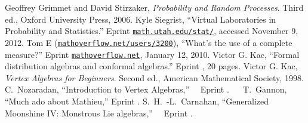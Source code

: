 \begin{thebibliography}{99}\small
{}
Geoffrey Grimmet and David Stirzaker,\newblock
\emph{Probability and Random Processes}.\newblock
Third ed., Oxford University Press, 2006.
Kyle Siegrist,\newblock
``Virtual Laboratories in Probability and Statistics.''\newblock
Eprint \href{http://www.math.uah.edu/stat/index.html}{\tt math.utah.edu/stat/}, accessed November
9, 2012.
 Tom E (\href{http://mathoverflow.net/users/3200/tom-e}{\tt mathoverflow.net/users/3200}),\newblock 
``What's the use of a complete measure?''\newblock
Eprint \href{http://mathoverflow.net/questions/11554}{\tt mathoverflow.net}, January 12, 2010.
Victor G. Kac,\newblock
``Formal distribution algebras and conformal algebras.''\newblock
Eprint , 20 pages.
  Victor G. Kac,\newblock
  \emph{Vertex Algebras for Beginners}.\newblock
  Second ed., American Mathematical Society, 1998.
  C.~Nozaradan,\newblock
  ``Introduction to Vertex Algebras,''\newblock
  Eprint .
  T.~Gannon,\newblock
  ``Much ado about Mathieu,''\newblock
  Eprint .
  S.~H.~-L.~Carnahan,\newblock
  ``Generalized Moonshine IV: Monstrous Lie algebras,''\newblock
  Eprint .
\end{thebibliography}
